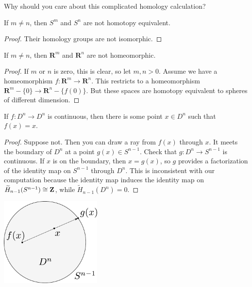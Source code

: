 Why should you care about this complicated homology calculation?
\begin{corollary}
If $m\neq n$, then $S^m$ and $S^n$ are not homotopy equivalent.
\end{corollary}
\begin{proof}
Their homology groups are not isomorphic.
\end{proof}
\begin{corollary}
If $m\neq n$, then $\mathbf{R}^m$ and $\mathbf{R}^n$ are not homeomorphic.
\end{corollary}
\begin{proof}
If $m$ or $n$ is zero, this is clear, so 
let $m,n>0$. Assume we have a homeomorphism $f:\mathbf{R}^m\to \mathbf{R}^n$. This restricts to a homeomorphism $\mathbf{R}^m-\{0\}\to \mathbf{R}^n-\{f(0)\}$.
But these spaces are homotopy equivalent to spheres of different dimension.
\end{proof}
\begin{theorem}
If $f:D^n\to D^n$ is continuous, 
then there is some point $x\in D^n$ such that $f(x)=x$.
\end{theorem}
\begin{proof}
Suppose not. Then you can draw a ray from $f(x)$ through $x$. It meets the boundary of $D^n$ at a point $g(x)\in S^{n-1}$. Check that $g:D^n\to S^{n-1}$ is continuous. If $x$ is on the boundary, then $x=g(x)$, so $g$ provides a factorization of the identity map on $S^{n-1}$ through $D^n$. This is inconsistent with our computation because the identity map induces the identity map on $\widetilde H_{n-1}(S^{n-1})\cong\mathbf Z$, while $\widetilde H_{n-1}(D^n)=0$.
\end{proof}

\medskip
\begin{center}
\includegraphics[width=2in]{905/Figures/10-Brouwer-FPT.pdf}
\end{center}

